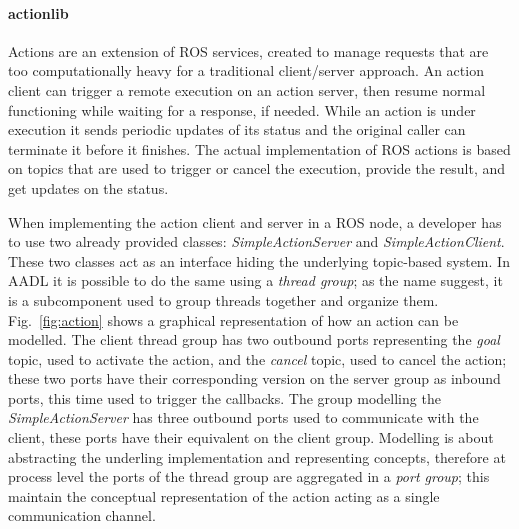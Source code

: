 \paragraph{actionlib} Actions are an extension of ROS services, created to manage requests that are too computationally heavy for a traditional client/server approach. An action client can trigger a remote execution on an action server, then resume normal functioning while waiting for a response, if needed. While an action is under execution it sends periodic updates of its status and the original caller can terminate it before it finishes. The actual implementation of ROS actions is based on topics that are used to trigger or cancel the execution, provide the result, and get updates on the status.
 
When implementing the action client and server in a ROS node, a developer has to use two already provided classes: \textit{SimpleActionServer} and \textit{SimpleActionClient}. These two classes act as an interface hiding the underlying topic-based system. In AADL it is possible to do the same using a \textit{thread group}; as the name suggest, it is a subcomponent used to group threads together and organize them. Fig.~\ref{fig:action} shows a graphical representation of how an action can be modelled. The client thread group has two outbound ports representing the \textit{goal} topic, used to activate the action, and the \textit{cancel} topic, used to cancel the action; these two ports have their corresponding version on the server group as inbound ports, this time used to trigger the callbacks. The group modelling the \textit{SimpleActionServer} has three outbound ports used to communicate with the client, these ports have their equivalent on the client group. Modelling is about abstracting the underling implementation and representing concepts, therefore at process level the ports of the thread group are aggregated in a \textit{port group}; this maintain the conceptual representation of the action acting as a single communication channel.

